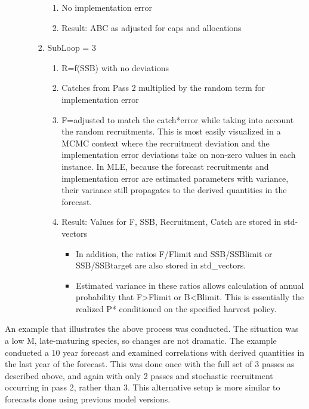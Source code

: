 \begin{enumerate}
\begin{enumerate}
\begin{enumerate}
\begin{enumerate}
				\item No implementation error
				\item Result: ABC as adjusted for caps and allocations
			\end{enumerate}
			\item SubLoop = 3
			\begin{enumerate}
				\item R=f(SSB) with no deviations
				\item Catches from Pass 2 multiplied by the random term for implementation error
				\item F=adjusted to match the catch*error while taking into account the random recruitments.  This is most easily visualized in a MCMC context where the recruitment deviation and the implementation error deviations take on non-zero values in each instance.  In MLE, because the forecast recruitments and implementation error are estimated parameters with variance, their variance still propagates to the derived quantities in the forecast.
				\item Result:  Values for F, SSB, Recruitment, Catch are stored in std-vectors
				\begin{itemize}
					\item In addition, the ratios F/Flimit and SSB/SSBlimit or SSB/SSBtarget are also stored in std\_vectors.
					\item Estimated variance in these ratios allows calculation of annual probability that F>Flimit or B<Blimit.  This is essentially the realized P* conditioned on the specified harvest policy.
				\end{itemize}
			\end{enumerate}
		\end{enumerate}
	\end{enumerate}
\end{enumerate}

An example that illustrates the above process was conducted.  The situation was a low M, late-maturing species, so changes are not dramatic.  The example conducted a 10 year forecast and examined correlations with derived quantities in the last year of the forecast.  This was done once with the full set of 3 passes as described above, and again with only 2 passes and stochastic recruitment occurring in pass 2, rather than 3.  This alternative setup is more similar to forecasts done using previous model versions.

